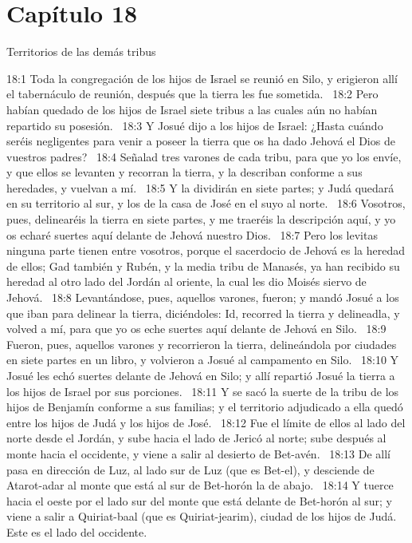 \section*{Capítulo 18}
Territorios de las demás tribus  

18:1 Toda la congregación de los hijos de Israel se reunió en Silo, y erigieron allí el tabernáculo de reunión, después que la tierra les fue sometida.  
18:2 Pero habían quedado de los hijos de Israel siete tribus a las cuales aún no habían repartido su posesión.  
18:3 Y Josué dijo a los hijos de Israel: ¿Hasta cuándo seréis negligentes para venir a poseer la tierra que os ha dado Jehová el Dios de vuestros padres?  
18:4 Señalad tres varones de cada tribu, para que yo los envíe, y que ellos se levanten y recorran la tierra, y la describan conforme a sus heredades, y vuelvan a mí.  
18:5 Y la dividirán en siete partes; y Judá quedará en su territorio al sur, y los de la casa de José en el suyo al norte.  
18:6 Vosotros, pues, delinearéis la tierra en siete partes, y me traeréis la descripción aquí, y yo os echaré suertes aquí delante de Jehová nuestro Dios.  
18:7 Pero los levitas ninguna parte tienen entre vosotros, porque el sacerdocio de Jehová es la heredad de ellos; Gad también y Rubén, y la media tribu de Manasés, ya han recibido su heredad al otro lado del Jordán al oriente, la cual les dio Moisés siervo de Jehová.  
18:8 Levantándose, pues, aquellos varones, fueron; y mandó Josué a los que iban para delinear la tierra, diciéndoles: Id, recorred la tierra y delineadla, y volved a mí, para que yo os eche suertes aquí delante de Jehová en Silo.  
18:9 Fueron, pues, aquellos varones y recorrieron la tierra, delineándola por ciudades en siete partes en un libro, y volvieron a Josué al campamento en Silo.  
18:10 Y Josué les echó suertes delante de Jehová en Silo; y allí repartió Josué la tierra a los hijos de Israel por sus porciones.  
18:11 Y se sacó la suerte de la tribu de los hijos de Benjamín conforme a sus familias; y el territorio adjudicado a ella quedó entre los hijos de Judá y los hijos de José.  
18:12 Fue el límite de ellos al lado del norte desde el Jordán, y sube hacia el lado de Jericó al norte; sube después al monte hacia el occidente, y viene a salir al desierto de Bet-avén.  
18:13 De allí pasa en dirección de Luz, al lado sur de Luz (que es Bet-el), y desciende de Atarot-adar al monte que está al sur de Bet-horón la de abajo.  
18:14 Y tuerce hacia el oeste por el lado sur del monte que está delante de Bet-horón al sur; y viene a salir a Quiriat-baal (que es Quiriat-jearim), ciudad de los hijos de Judá. Este es el lado del occidente.  
